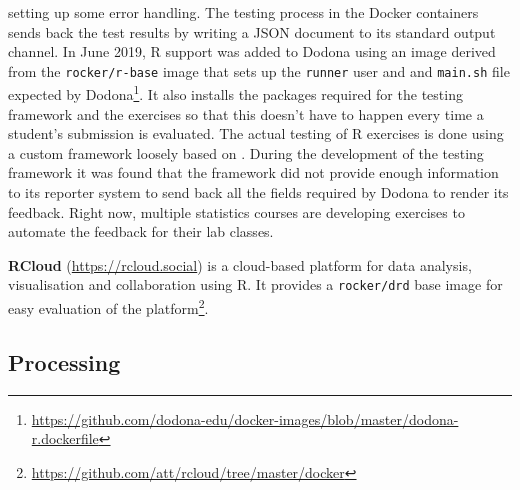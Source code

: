 setting up some error handling. The testing process in the Docker
containers sends back the test results by writing a JSON document to its
standard output channel. In June 2019, R support was added to Dodona
using an image derived from the \texttt{rocker/r-base} image that sets
up the \texttt{runner} user and and \texttt{main.sh} file expected by
Dodona\footnote{\href{https://github.com/dodona-edu/docker-images/blob/master/dodona-r.dockerfile}{https://github.com/dodona-edu/docker-images/blob/master/dodona-r.dockerfile}}.
It also installs the packages required for the testing framework and the
exercises so that this doesn't have to happen every time a student's
submission is evaluated. The actual testing of R exercises is done using
a custom framework loosely based on . During the
development of the testing framework it was found that the
 framework did not provide enough information to its
reporter system to send back all the fields required by Dodona to render
its feedback. Right now, multiple statistics courses are developing
exercises to automate the feedback for their lab classes.

\textbf{RCloud} (\url{https://rcloud.social}) is a cloud-based platform
for data analysis, visualisation and collaboration using R. It provides
a \texttt{rocker/drd} base image for easy evaluation of the
platform\footnote{\href{https://github.com/att/rcloud/tree/master/docker}{https://github.com/att/rcloud/tree/master/docker}}.

\hypertarget{processing}{%
\subsection{Processing}\label{processing}}

\label{processing}

